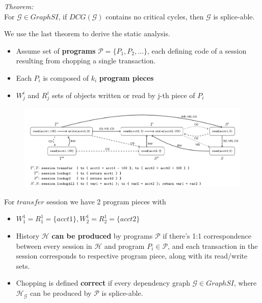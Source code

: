 \documentclass{beamer}
\begin{document}
\begin{frame}
	\textit{Theorem:} \\
	For $\mathcal{G} \in GraphSI$, if $DCG(\mathcal{G})$ contains no critical cycles, then $\mathcal{G}$ is splice-able.
\end{frame}


\begin{frame}
We use the last theorem to derive the static analysis.
\begin{itemize}
	\item Assume set of \textbf{programs} $\mathcal{P}=\{P_1, P_2, \dots\}$, each defining code of a session resulting from chopping a single transaction.
	\item Each $P_i$ is composed of $k_i$ \textbf{program pieces}
	\item $W^i_j$ and $R^i_j$ sets of objects written or read by j-th piece of $P_i$ 
\end{itemize}
\end{frame}

\begin{frame}
\begin{figure}
\includegraphics[scale=0.28]{fig4}
\end{figure}
For $transfer$ session we have 2 program pieces with
\begin{itemize}
\item $W^1_1 = R^1_1 = \{acct1\}, W^1_2 = R^1_2 = \{acct2\}$
\end{itemize}
\end{frame}

\begin{frame}
	\begin{itemize}
		\item History $\mathcal{H}$ \textbf{can be produced} by programs $\mathcal{P}$ if there's 1:1 correspondence between every session in $\mathcal{H}$ and program $P_i\in\mathcal{P}$, and each transaction in the session corresponds to respective program piece, along with its read/write sets.
		\item Chopping is defined \textbf{correct} if every dependency graph $\mathcal{G}\in GraphSI$, where $\mathcal{H}_\mathcal{G}$ can be produced by $\mathcal{P}$ is splice-able.
	\end{itemize}
\end{frame}
\end{document}

